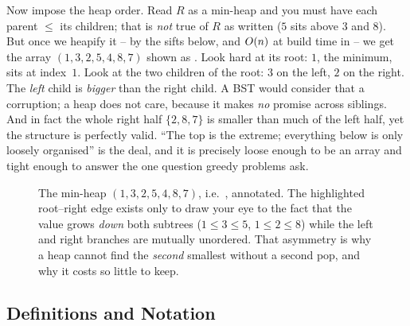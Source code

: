 Now impose the heap order. Read $R$ as a min-heap and you must have each parent $\le$ its children; that
is \emph{not} true of $R$ as written ($5$ sits above $3$ and $8$). But once we heapify it -- by the sifts
below, and $O(n)$ at build time in  -- we get the array $(1,3,2,5,4,8,7)$ shown as
. Look hard at its root: $1$, the minimum, sits at index~$1$. Look at the two children
of the root: $3$ on the left, $2$ on the right. The \emph{left} child is \emph{bigger} than the right
child. A BST would consider that a corruption; a heap does not care, because it makes \emph{no} promise
across siblings. And in fact the whole right half $\{2,8,7\}$ is smaller than much of the left half, yet
the structure is perfectly valid. ``The top is the extreme; everything below is only loosely organised''
is the deal, and it is precisely loose enough to be an array and tight enough to answer the one question
greedy problems ask.

\begin{figure}[H]
\centering
{}
\caption*{The min-heap $(1,3,2,5,4,8,7)$, i.e.\ , annotated. The highlighted root--right
edge exists only to draw your eye to the fact that the value grows \emph{down} both subtrees ($1\le3\le5$,
$1\le2\le8$) while the left and right branches are mutually unordered. That asymmetry is why a heap cannot
find the \emph{second} smallest without a second pop, and why it costs so little to keep.}
\end{figure}

\subsection{Definitions and Notation}

